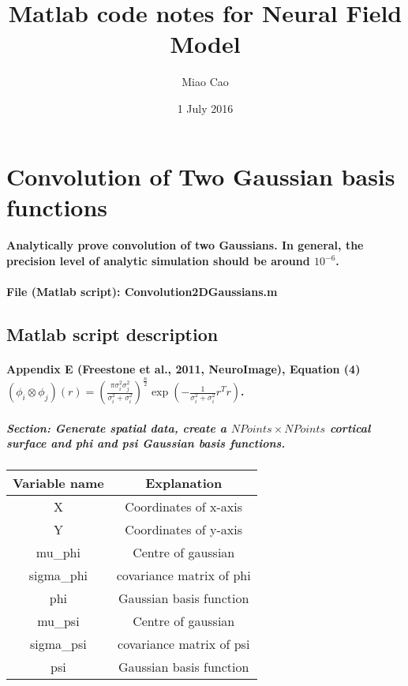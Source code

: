 \documentclass[a4paper, 8pt, english]{article}
\begin{document}
\title{Matlab code notes for Neural Field Model}
\author{Miao Cao}
\date{1 July 2016}
\maketitle



\section{Convolution of Two Gaussian basis functions}

\paragraph{Analytically prove convolution of two Gaussians. In general, the
precision level of analytic simulation should be around $10^{-6}$.}

\paragraph{File (Matlab script): Convolution2DGaussians.m}

\subsection*{Matlab script description}

\paragraph{Appendix E (Freestone et al., 2011, NeuroImage), Equation (4) $\left(\phi_{i}\otimes\phi_{j}\right)(r)=(\frac{\pi\sigma_{i}^{2}\sigma_{j}^{2}}{\sigma_{i}^{2}+\sigma_{i}^{2}})^{\frac{n}{2}}\exp(-\frac{1}{\sigma_{i}^{2}+\sigma_{i}^{2}}r^{T}r)$.}

\subparagraph{Section: Generate spatial data, create a $NPoints\times NPoints$ cortical surface and phi and psi Gaussian basis functions.\\}


\begin{tabular}{|c|c|}
\hline
Variable name & Explanation\tabularnewline
\hline
X & Coordinates of x-axis\tabularnewline
\hline
Y & Coordinates of y-axis\tabularnewline
\hline
mu\_phi & Centre of gaussian\tabularnewline
\hline
sigma\_phi & covariance matrix of phi\tabularnewline
\hline
phi & Gaussian basis function\tabularnewline
\hline
mu\_psi & Centre of gaussian\tabularnewline
\hline
sigma\_psi & covariance matrix of psi\tabularnewline
\hline
psi & Gaussian basis function\tabularnewline
\hline
\end{tabular}
\end{document}
